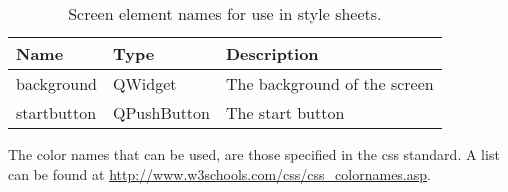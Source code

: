 \begin{table}
\begin{center}
\begin{tabular}{lll}    \toprule
Name & Type & Description \\ \midrule
background & QWidget & The background of the screen \\
startbutton & QPushButton & The start button \\
\bottomrule
\end{tabular}
\end{center}

\caption{Screen element names for use in style sheets.}
\label{tab:names}
\end{table}


The color names that can be used, are those specified in the css standard. A list can be found at \url{http://www.w3schools.com/css/css_colornames.asp}.
